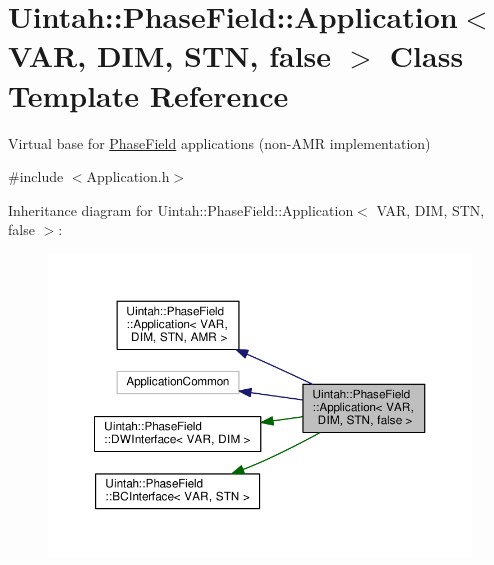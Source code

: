 \hypertarget{classUintah_1_1PhaseField_1_1Application_3_01VAR_00_01DIM_00_01STN_00_01false_01_4}{}\section{Uintah\+:\+:Phase\+Field\+:\+:Application$<$ V\+AR, D\+IM, S\+TN, false $>$ Class Template Reference}
\label{classUintah_1_1PhaseField_1_1Application_3_01VAR_00_01DIM_00_01STN_00_01false_01_4}


Virtual base for \hyperlink{namespaceUintah_1_1PhaseField}{Phase\+Field} applications (non-\/\+A\+MR implementation)  




{\ttfamily \#include $<$Application.\+h$>$}



Inheritance diagram for Uintah\+:\+:Phase\+Field\+:\+:Application$<$ V\+AR, D\+IM, S\+TN, false $>$\+:\nopagebreak
\begin{figure}[H]
\begin{center}
\leavevmode
\includegraphics[width=350pt]{classUintah_1_1PhaseField_1_1Application_3_01VAR_00_01DIM_00_01STN_00_01false_01_4__inherit__graph}
\end{center}
\end{figure}



